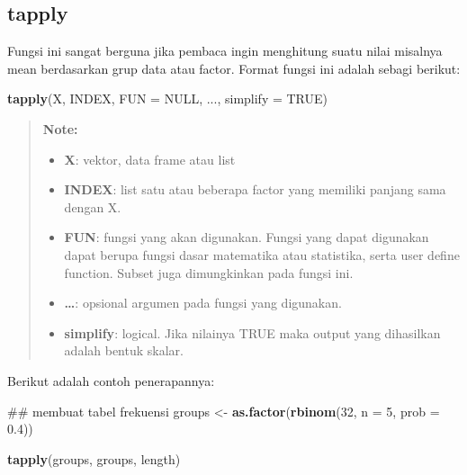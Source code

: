 \documentclass[]{book}
\newenvironment{Shaded}{\begin{snugshade}}{\end{snugshade}}
\newcommand{\KeywordTok}[1]{\textcolor[rgb]{0.13,0.29,0.53}{\textbf{#1}}}
\newcommand{\DataTypeTok}[1]{\textcolor[rgb]{0.13,0.29,0.53}{#1}}
\newcommand{\DecValTok}[1]{\textcolor[rgb]{0.00,0.00,0.81}{#1}}
\newcommand{\FloatTok}[1]{\textcolor[rgb]{0.00,0.00,0.81}{#1}}
\newcommand{\StringTok}[1]{\textcolor[rgb]{0.31,0.60,0.02}{#1}}
\newcommand{\OtherTok}[1]{\textcolor[rgb]{0.56,0.35,0.01}{#1}}
\newcommand{\NormalTok}[1]{#1}
\providecommand{\tightlist}{%
  \setlength{\itemsep}{0pt}\setlength{\parskip}{0pt}}
\begin{document}
\subsection{tapply}\label{tapply}

Fungsi ini sangat berguna jika pembaca ingin menghitung suatu nilai
misalnya mean berdasarkan grup data atau factor. Format fungsi ini
adalah sebagi berikut:

\begin{Shaded}
\begin{Highlighting}[]
\KeywordTok{tapply}\NormalTok{(X, INDEX, }\DataTypeTok{FUN =} \OtherTok{NULL}\NormalTok{, ..., }\DataTypeTok{simplify =} \OtherTok{TRUE}\NormalTok{)}
\end{Highlighting}
\end{Shaded}

\begin{quote}
\textbf{Note: }

\begin{itemize}
\tightlist
\item
  \textbf{X}: vektor, data frame atau list
\item
  \textbf{INDEX}: list satu atau beberapa factor yang memiliki panjang
  sama dengan X.
\item
  \textbf{FUN}: fungsi yang akan digunakan. Fungsi yang dapat digunakan
  dapat berupa fungsi dasar matematika atau statistika, serta user
  define function. Subset juga dimungkinkan pada fungsi ini.
\item
  \textbf{\ldots{}}: opsional argumen pada fungsi yang digunakan.
\item
  \textbf{simplify}: logical. Jika nilainya TRUE maka output yang
  dihasilkan adalah bentuk skalar.
\end{itemize}
\end{quote}

Berikut adalah contoh penerapannya:

\begin{Shaded}
\begin{Highlighting}[]
\NormalTok{## membuat tabel frekuensi}
\NormalTok{groups <-}\StringTok{ }\KeywordTok{as.factor}\NormalTok{(}\KeywordTok{rbinom}\NormalTok{(}\DecValTok{32}\NormalTok{, }\DataTypeTok{n =} \DecValTok{5}\NormalTok{, }\DataTypeTok{prob =} \FloatTok{0.4}\NormalTok{))}

\KeywordTok{tapply}\NormalTok{(groups, groups, length)}
\end{Highlighting}
\end{Shaded}
\end{document}
